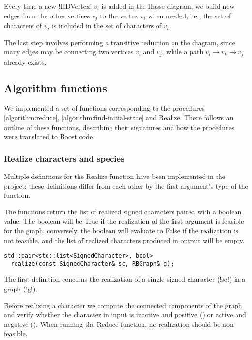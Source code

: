 Every time a new !HDVertex! $v_{i}$ is added in the Hasse diagram, we build new edges from the other vertices $v_{j}$ to the vertex $v_{i}$ when needed, i.e., the set of characters of $v_{j}$ is included in the set of characters of $v_{i}$.

The last step involves performing a transitive reduction on the diagram, since many edges may be connecting two vertices $v_{i}$ and $v_{j}$, while a path $v_{i} \rightarrow v_{k} \rightarrow v_{j}$ already exists.

\subsection{Algorithm functions}\label{section:algorithm-functions}

We implemented a set of functions corresponding to the procedures \ref{algorithm:reduce}, \ref{algorithm:find-initial-state} and Realize. There follows an outline of these functions, describing their signatures and how the procedures were translated to Boost \cc{} code.

\subsubsection{Realize characters and species}\label{section:realize}

Multiple definitions for the Realize function have been implemented in the project; these definitions differ from each other by the first argument's type of the function.

The functions return the list of realized signed characters paired with a boolean value.
The boolean will be True if the realization of the first argument is feasible for the graph; conversely, the boolean will evaluate to False if the realization is not feasible, and the list of realized characters produced in output will be empty.

\text{}

\begin{lstlisting}[moreemph={RBGraph, SignedCharacter},
                   moreemph={[2]realize}]
  std::pair<std::list<SignedCharacter>, bool>
  realize(const SignedCharacter& sc, RBGraph& g);
\end{lstlisting}

The first definition concerns the realization of a single signed character \character[][\pm] (!sc!) in a graph \grb{} (!g!).

Before realizing a character we compute the connected components of the graph and verify whether the character in input is inactive and positive (\character[][+]) or active and negative (\character[][-]).
When running the Reduce function, no realization should be non-feasible.

